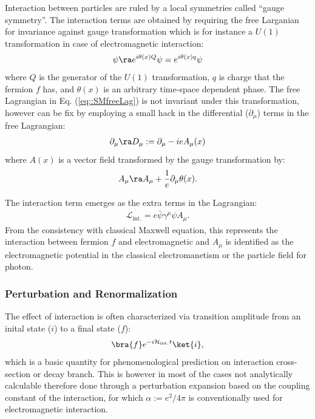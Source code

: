 Interaction between particles are ruled by a local symmetries called ``gauge symmetry''. 
The interaction terms are obtained by requiring the free Larganian for invariance against gauge transformation which is for instance a $U(1)$ transformation in case of electromagnetic interaction:
\begin{align}
\psi \ra e^{i\theta(x) Q} \psi = e^{i\theta(x) q} \psi
\end{align}
where $Q$ is the generator of the $U(1)$ transformation, $q$ is charge that the fermion $f$ has, and $\theta(x)$ is an arbitrary time-space dependent phase.
The free Lagrangian in Eq. (\ref{eq::SMfreeLag}) is not invariant under this transformation, however can be fix by employing a small hack in the differential ($\partial_\mu$) terms in the free Lagrangian:
\begin{align}
\partial_\mu \ra D_\mu := \partial_\mu - ieA_\mu (x)
\end{align}
where $A(x)$ is a vector field transformed by the gauge transformation by:
\begin{align}
A_\mu \ra A_\mu + \frac{1}{e} \partial_\mu \theta(x).
\end{align}

The interaction term emerges as the extra terms in the Lagrangian:
\begin{align}
\mathcal{L}_{\mathrm{int.}} = e\bar{\psi} \gamma^\mu \psi A_\mu.
\label{eq::SMfreeLag}
\end{align}
From the consistency with classical Maxwell equation, this represents the interaction between fermion $f$ and electromagnetic
and $A_\mu$ is identified as the electromagnetic potential in the classical electromanetism or the particle field for photon. \\



\subsubsection{Perturbation and Renormalization}
The effect of interaction is often characterized via transition amplitude from an inital state ($i$) to a final state ($f$):
\begin{align}
\bra{f} e^{-i\mathcal{H}_{\mathrm{int.}}t} \ket{i},
\end{align}
which is a basic quantity for phenomenological prediction on interaction cross-section or decay branch. 
This is however in most of the cases not analytically calculable therefore done through a perturbation expansion based on the coupling constant of the interaction, for which $\alpha := e^2/4\pi$ is conventionally used for electromagnetic interaction. 


